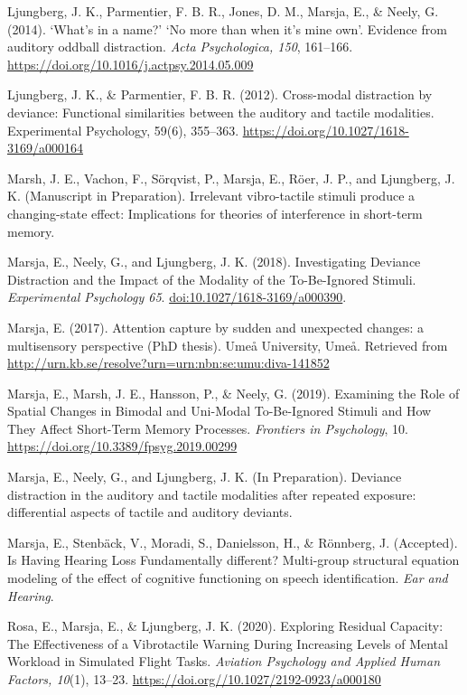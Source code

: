 \documentclass[]{article}
\begin{document}
Ljungberg, J. K., Parmentier, F. B. R., Jones, D. M., Marsja, E., \&
Neely, G. (2014). `What's in a name?' `No more than when it's mine own'.
Evidence from auditory oddball distraction. \emph{Acta Psychologica,
150}, 161--166. \url{https://doi.org/10.1016/j.actpsy.2014.05.009}

Ljungberg, J. K., \& Parmentier, F. B. R. (2012). Cross-modal
distraction by deviance: Functional similarities between the auditory
and tactile modalities. Experimental Psychology, 59(6), 355--363.
\url{https://doi.org/10.1027/1618-3169/a000164}

Marsh, J. E., Vachon, F., Sörqvist, P., Marsja, E., Röer, J. P., and
Ljungberg, J. K. (Manuscript in Preparation). Irrelevant vibro-tactile
stimuli produce a changing-state effect: Implications for theories of
interference in short-term memory.

Marsja, E., Neely, G., and Ljungberg, J. K. (2018). Investigating
Deviance Distraction and the Impact of the Modality of the To-Be-Ignored
Stimuli. \emph{Experimental Psychology 65}.
\url{doi:10.1027/1618-3169/a000390}.

Marsja, E. (2017). Attention capture by sudden and unexpected changes: a
multisensory perspective (PhD thesis). Umeå University, Umeå. Retrieved
from \url{http://urn.kb.se/resolve?urn=urn:nbn:se:umu:diva-141852}

Marsja, E., Marsh, J. E., Hansson, P., \& Neely, G. (2019). Examining
the Role of Spatial Changes in Bimodal and Uni-Modal To-Be-Ignored
Stimuli and How They Affect Short-Term Memory Processes. \emph{Frontiers
in Psychology}, 10. \url{https://doi.org/10.3389/fpsyg.2019.00299}

Marsja, E., Neely, G., and Ljungberg, J. K. (In Preparation). Deviance
distraction in the auditory and tactile modalities after repeated
exposure: differential aspects of tactile and auditory deviants.

Marsja, E., Stenbäck, V., Moradi, S., Danielsson, H., \& Rönnberg, J.
(Accepted). Is Having Hearing Loss Fundamentally different? Multi-group
structural equation modeling of the effect of cognitive functioning on
speech identification. \emph{Ear and Hearing}.

Rosa, E., Marsja, E., \& Ljungberg, J. K. (2020). Exploring Residual
Capacity: The Effectiveness of a Vibrotactile Warning During Increasing
Levels of Mental Workload in Simulated Flight Tasks. \emph{Aviation
Psychology and Applied Human Factors, 10}(1), 13--23.
\url{https://doi.org//10.1027/2192-0923/a000180}
\end{document}
